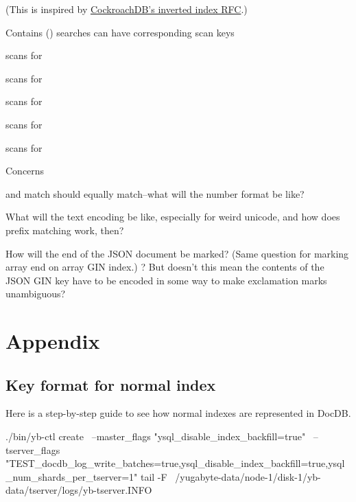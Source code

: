 \documentclass[11pt]{article}
\begin{document}
(This is inspired by
\href{https://github.com/cockroachdb/cockroach/blob/master/docs/RFCS/20171020_inverted_indexes.md}{CockroachDB's
inverted index RFC}.)

Contains () searches can have corresponding scan keys

\begin{oparts}
\item
  scans for 
\item
  scans for
\item
  scans for
\item
  scans for
\item
  scans for
\end{oparts}

Concerns

\begin{oparts}
\item
   and  match should equally match--what will the
  number format be like?
\item
  What will the text encoding be like, especially for weird unicode, and how
  does prefix matching work, then?
\item
  How will the end of the JSON document be marked? (Same question for marking
  array end on array GIN index.) ? But doesn't this mean
  the contents of the JSON GIN key have to be encoded in some way to make
  exclamation marks unambiguous?
\end{oparts}

\hypertarget{appendix}{%
\section{Appendix}\label{appendix}}

\hypertarget{key-format-for-normal-index}{%
\subsection{Key format for normal
index}\label{key-format-for-normal-index}}

Here is a step-by-step guide to see how normal indexes are represented in
DocDB.

\begin{bashcode}
./bin/yb-ctl create \
  --master_flags "ysql_disable_index_backfill=true" \
  --tserver_flags "TEST_docdb_log_write_batches=true,ysql_disable_index_backfill=true,ysql_num_shards_per_tserver=1"
tail -F ~/yugabyte-data/node-1/disk-1/yb-data/tserver/logs/yb-tserver.INFO
\end{bashcode}
\end{document}
